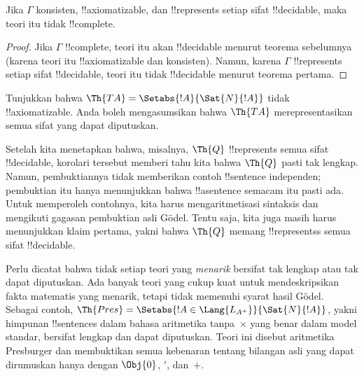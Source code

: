 \documentclass[../../../include/open-logic-section]{subfiles}
\begin{document}
\begin{cor}
Jika $\Gamma$ konsisten, !!{axiomatizable}, dan !!{represents} setiap sifat
!!{decidable}, maka teori itu tidak !!{complete}.
\end{cor}

\begin{proof}
Jika $\Gamma$ !!{complete}, teori itu akan !!{decidable} menurut teorema
sebelumnya (karena teori itu !!{axiomatizable} dan konsisten). Namun, karena
$\Gamma$ !!{represents} setiap sifat !!{decidable}, teori itu tidak
!!{decidable} menurut teorema pertama.
\end{proof}

\begin{prob}
Tunjukkan bahwa $\Th{TA} = \Setabs{!A}{\Sat{N}{!A}}$ tidak
!!{axiomatizable}. Anda boleh mengasumsikan bahwa $\Th{TA}$ merepresentasikan
semua sifat yang dapat diputuskan.
\end{prob}

Setelah kita menetapkan bahwa, misalnya, $\Th{Q}$ !!{represents} semua sifat
!!{decidable}, korolari tersebut memberi tahu kita bahwa $\Th{Q}$ pasti tak
lengkap. Namun, pembuktiannya tidak memberikan contoh !!{sentence}
independen; pembuktian itu hanya menunjukkan bahwa !!a{sentence} semacam itu
pasti ada. Untuk memperoleh contohnya, kita harus mengaritmetisasi sintaksis
dan mengikuti gagasan pembuktian asli G\"odel. Tentu saja, kita juga masih
harus menunjukkan klaim pertama, yakni bahwa $\Th{Q}$ memang
!!{represents}s semua sifat !!{decidable}.

Perlu dicatat bahwa tidak setiap teori yang \emph{menarik} bersifat tak
lengkap atau tak dapat diputuskan. Ada banyak teori yang cukup kuat untuk
mendeskripsikan fakta matematis yang menarik, tetapi tidak memenuhi syarat
hasil G\"odel. Sebagai contoh, $\Th{Pres} = \Setabs{!A \in
\Lang{L_{A^+}}}{\Sat{N}{!A}}$, yakni himpunan !!{sentence}s dalam bahasa
aritmetika tanpa~$\times$ yang benar dalam model standar, bersifat lengkap
dan dapat diputuskan. Teori ini disebut aritmetika Presburger dan membuktikan
semua kebenaran tentang bilangan asli yang dapat dirumuskan hanya dengan
$\Obj{0}$, $\prime$, dan~$+$.
\end{document}
